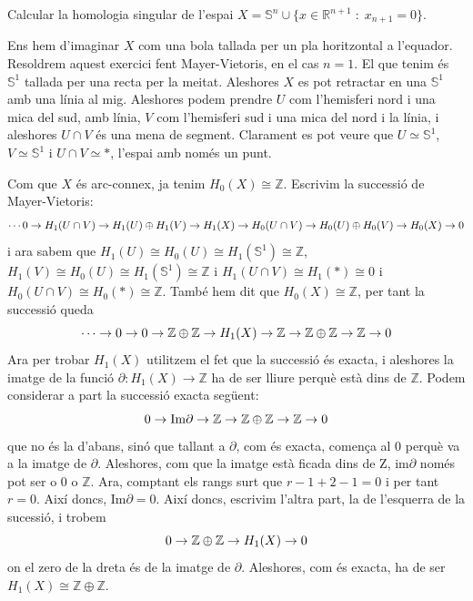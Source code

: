\documentclass[../main.tex]{subfiles}
\begin{document}
\begin{exercici}
Calcular la homologia singular de l'espai $X = \mathbb{S}^n\cup\{x\in\mathbb{R}^{n+1}\;:\; x_{n+1}=0\}$.
\end{exercici}
\begin{sol}
Ens hem d'imaginar $X$ com una bola tallada per un pla horitzontal a l'equador. Resoldrem aquest exercici fent Mayer-Vietoris, en el cas $n = 1$. El que tenim és $\mathbb{S}^1$ tallada per una recta per la meitat. Aleshores $X$ es pot retractar en una $\mathbb{S}^1$ amb una línia al mig. Aleshores podem prendre $U$ com l'hemisferi nord i una mica del sud, amb línia, $V$ com l'hemisferi sud i una mica del nord i la línia, i aleshores $U\cap V$ és una mena de segment. Clarament es pot veure que $U\simeq \mathbb{S}^1$, $V\simeq \mathbb{S}^1$ i $U\cap V\simeq *$, l'espai amb només un punt.

Com que $X$ és arc-connex, ja tenim $H_0(X) \cong \mathbb{Z}$. Escrivim la successió de Mayer-Vietoris:
\begin{equation}
    \notag
    \cdots0\rightarrow H_1(U\cap V)\rightarrow H_1(U)\oplus H_1(V)\rightarrow H_1(X)\rightarrow H_0(U\cap V)\rightarrow H_0(U)\oplus H_0(V)\rightarrow H_0(X)\rightarrow 0
\end{equation}
i ara sabem que $H_1(U)\cong H_0(U)\cong H_1(\mathbb{S}^1)\cong\mathbb{Z}$, $H_1(V)\cong H_0(U)\cong H_1(\mathbb{S}^1)\cong\mathbb{Z}$ i $H_1(U\cap V)\cong H_1(*)\cong 0$ i $H_0(U\cap V)\cong H_0(*) \cong\mathbb{Z}$. També hem dit que $H_0(X)\cong \mathbb{Z}$, per tant la successió queda
\begin{equation}
    \notag
    \cdots\rightarrow 0\rightarrow 0\rightarrow \mathbb{Z}\oplus\mathbb{Z}\rightarrow H_1(X)\rightarrow \mathbb{Z}\rightarrow \mathbb{Z}\oplus\mathbb{Z}\rightarrow \mathbb{Z}\rightarrow 0
\end{equation}
Ara per trobar $H_1(X)$ utilitzem el fet que la successió és exacta, i aleshores la imatge de la funció $\partial: H_1(X)\rightarrow \mathbb{Z}$ ha de ser lliure perquè està dins de $\mathbb{Z}$. Podem considerar a part la successió exacta següent:
\begin{equation}
    \notag
    0\rightarrow\mathrm{Im}\partial\rightarrow \mathbb{Z}\rightarrow\mathbb{Z}\oplus\mathbb{Z}\rightarrow\mathbb{Z}\rightarrow 0
\end{equation}
que no és la d'abans, sinó que tallant a $\partial$, com és exacta, comença al 0 perquè va a la imatge de $\partial$. Aleshores, com que la imatge està ficada dins de $\mathrm{Z}$, $\mathrm{im}\partial$ només pot ser o $0$ o $\mathbb{Z}$. Ara, comptant els rangs surt que $r-1+2-1=0$ i per tant $r = 0$. Així doncs, $\mathrm{Im}\partial = 0$. Així doncs, escrivim l'altra part, la de l'esquerra de la sucessió, i trobem
\begin{equation}
    \notag
    0\rightarrow\mathbb{Z}\oplus\mathbb{Z}\rightarrow H_1(X)\rightarrow 0
\end{equation}
on el zero de la dreta és de la imatge de $\partial$. Aleshores, com és exacta, ha de ser $H_1(X)\cong\mathbb{Z}\oplus\mathbb{Z}$.


\end{sol}
\end{document}

